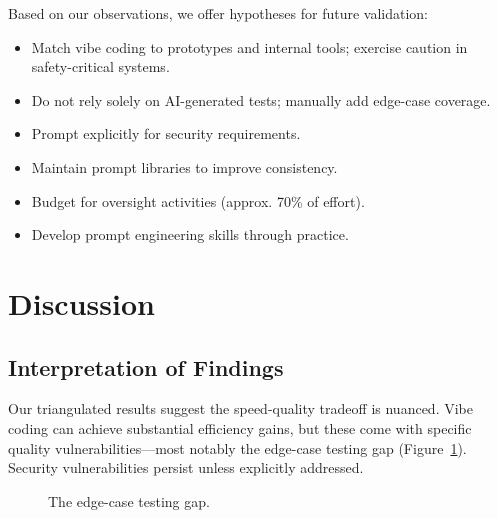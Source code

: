 \documentclass[sigconf]{acmart}
\begin{document}
Based on our observations, we offer hypotheses for future validation:
\begin{itemize}
    \item Match vibe coding to prototypes and internal tools; exercise caution in safety-critical systems.
    \item Do not rely solely on AI-generated tests; manually add edge-case coverage.
    \item Prompt explicitly for security requirements.
    \item Maintain prompt libraries to improve consistency.
    \item Budget for oversight activities (approx. 70\% of effort).
    \item Develop prompt engineering skills through practice.
\end{itemize}

\section{Discussion}

\subsection{Interpretation of Findings}

Our triangulated results suggest the speed-quality tradeoff is nuanced. Vibe coding can achieve substantial efficiency gains, but these come with specific quality vulnerabilities—most notably the edge-case testing gap (Figure~\ref{fig:testing}). Security vulnerabilities persist unless explicitly addressed.

\begin{figure}[htbp]
\centering
{}
\caption{The edge-case testing gap.}
\label{fig:testing}
\end{figure}
\end{document}
